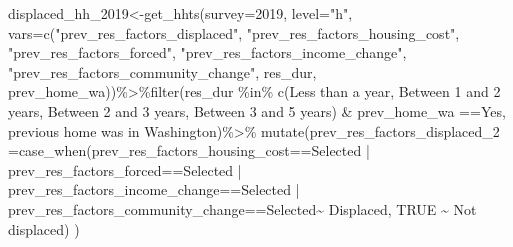 \documentclass[
]{article}
\newenvironment{Shaded}{\begin{snugshade}}{\end{snugshade}}
\newcommand{\AttributeTok}[1]{\textcolor[rgb]{0.77,0.63,0.00}{#1}}
\newcommand{\ConstantTok}[1]{\textcolor[rgb]{0.00,0.00,0.00}{#1}}
\newcommand{\FunctionTok}[1]{\textcolor[rgb]{0.00,0.00,0.00}{#1}}
\newcommand{\NormalTok}[1]{#1}
\newcommand{\OtherTok}[1]{\textcolor[rgb]{0.56,0.35,0.01}{#1}}
\newcommand{\SpecialCharTok}[1]{\textcolor[rgb]{0.00,0.00,0.00}{#1}}
\newcommand{\StringTok}[1]{\textcolor[rgb]{0.31,0.60,0.02}{#1}}
\begin{document}
\begin{Shaded}
\begin{Highlighting}[]
\NormalTok{displaced\_hh\_2019}\OtherTok{\textless{}{-}}\FunctionTok{get\_hhts}\NormalTok{(}\AttributeTok{survey=}\StringTok{\textquotesingle{}2019\textquotesingle{}}\NormalTok{, }\AttributeTok{level=}\StringTok{"h"}\NormalTok{, }\AttributeTok{vars=}\FunctionTok{c}\NormalTok{(}\StringTok{"prev\_res\_factors\_displaced"}\NormalTok{, }\StringTok{"prev\_res\_factors\_housing\_cost"}\NormalTok{, }\StringTok{"prev\_res\_factors\_forced"}\NormalTok{, }\StringTok{"prev\_res\_factors\_income\_change"}\NormalTok{, }\StringTok{"prev\_res\_factors\_community\_change"}\NormalTok{, }\StringTok{\textquotesingle{}res\_dur\textquotesingle{}}\NormalTok{, }\StringTok{\textquotesingle{}prev\_home\_wa\textquotesingle{}}\NormalTok{))}\SpecialCharTok{\%\textgreater{}\%}\FunctionTok{filter}\NormalTok{(res\_dur }\SpecialCharTok{\%in\%} \FunctionTok{c}\NormalTok{(}\StringTok{\textquotesingle{}Less than a year\textquotesingle{}}\NormalTok{, }\StringTok{\textquotesingle{} Between 1 and 2 years\textquotesingle{}}\NormalTok{, }\StringTok{\textquotesingle{}Between 2 and 3 years\textquotesingle{}}\NormalTok{,    }\StringTok{\textquotesingle{}Between 3 and 5 years\textquotesingle{}}\NormalTok{) }\SpecialCharTok{\&}\NormalTok{ prev\_home\_wa }\SpecialCharTok{==}\StringTok{\textquotesingle{}Yes, previous home was in Washington\textquotesingle{}}\NormalTok{)}\SpecialCharTok{\%\textgreater{}\%} 
  \FunctionTok{mutate}\NormalTok{(}\AttributeTok{prev\_res\_factors\_displaced\_2 =}\FunctionTok{case\_when}\NormalTok{(prev\_res\_factors\_housing\_cost}\SpecialCharTok{==}\StringTok{\textquotesingle{}Selected\textquotesingle{}} \SpecialCharTok{|} 
\NormalTok{                                                   prev\_res\_factors\_forced}\SpecialCharTok{==}\StringTok{\textquotesingle{}Selected\textquotesingle{}} \SpecialCharTok{|} 
\NormalTok{                                                   prev\_res\_factors\_income\_change}\SpecialCharTok{==}\StringTok{\textquotesingle{}Selected\textquotesingle{}} \SpecialCharTok{|}\NormalTok{                prev\_res\_factors\_community\_change}\SpecialCharTok{==}\StringTok{\textquotesingle{}Selected\textquotesingle{}}\SpecialCharTok{\textasciitilde{}} \StringTok{\textquotesingle{}Displaced\textquotesingle{}}\NormalTok{, }
  \ConstantTok{TRUE} \SpecialCharTok{\textasciitilde{}} \StringTok{\textquotesingle{}Not displaced\textquotesingle{}}\NormalTok{)   )                                                                                                                                                                                                                                                                                                                                                                                                                                                                       }


\end{Highlighting}
\end{Shaded}
\end{document}
